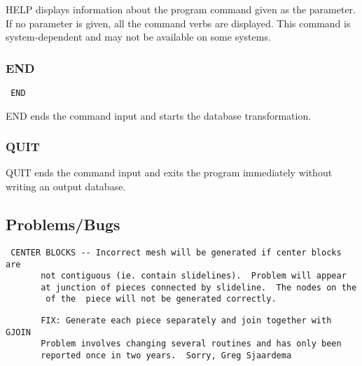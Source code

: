 HELP displays information about the program command given as the
parameter.  If no parameter is given, all the command verbs are
displayed.  This command is system-dependent and may not be available on
some systems.
\subsubsection{END}
\begin{verbatim}
 END
\end{verbatim}

END ends the command input and starts the database transformation.
\subsubsection{QUIT}
QUIT ends the command input and exits the program immediately without
writing an output database.
\subsection{Problems/Bugs}
\begin{verbatim}
 CENTER BLOCKS -- Incorrect mesh will be generated if center blocks are
       not contiguous (ie. contain slidelines).  Problem will appear
       at junction of pieces connected by slideline.  The nodes on the
        of the  piece will not be generated correctly.
\end{verbatim}

\begin{verbatim}
       FIX: Generate each piece separately and join together with GJOIN
       Problem involves changing several routines and has only been
       reported once in two years.  Sorry, Greg Sjaardema
\end{verbatim}
